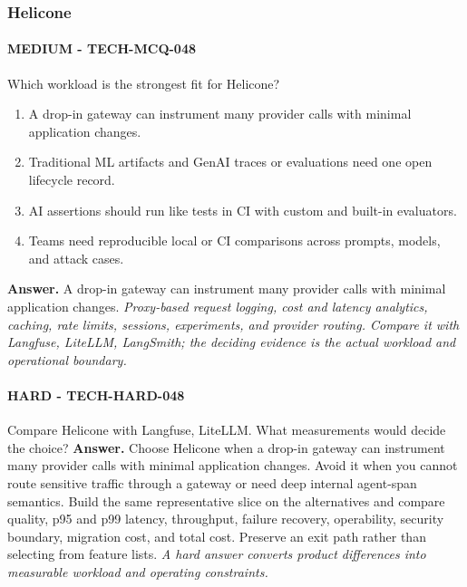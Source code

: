 \subsubsection*{Helicone}
\paragraph{MEDIUM - TECH-MCQ-048} Which workload is the strongest fit for Helicone?
\begin{enumerate}[label=\Alph*.]
\item A drop-in gateway can instrument many provider calls with minimal application changes.
\item Traditional ML artifacts and GenAI traces or evaluations need one open lifecycle record.
\item AI assertions should run like tests in CI with custom and built-in evaluators.
\item Teams need reproducible local or CI comparisons across prompts, models, and attack cases.
\end{enumerate}
\textbf{Answer.} A drop-in gateway can instrument many provider calls with minimal application changes.
\textit{Proxy-based request logging, cost and latency analytics, caching, rate limits, sessions, experiments, and provider routing. Compare it with Langfuse, LiteLLM, LangSmith; the deciding evidence is the actual workload and operational boundary.}
\paragraph{HARD - TECH-HARD-048} Compare Helicone with Langfuse, LiteLLM. What measurements would decide the choice?
\textbf{Answer.} Choose Helicone when a drop-in gateway can instrument many provider calls with minimal application changes. Avoid it when you cannot route sensitive traffic through a gateway or need deep internal agent-span semantics. Build the same representative slice on the alternatives and compare quality, p95 and p99 latency, throughput, failure recovery, operability, security boundary, migration cost, and total cost. Preserve an exit path rather than selecting from feature lists.
\textit{A hard answer converts product differences into measurable workload and operating constraints.}

